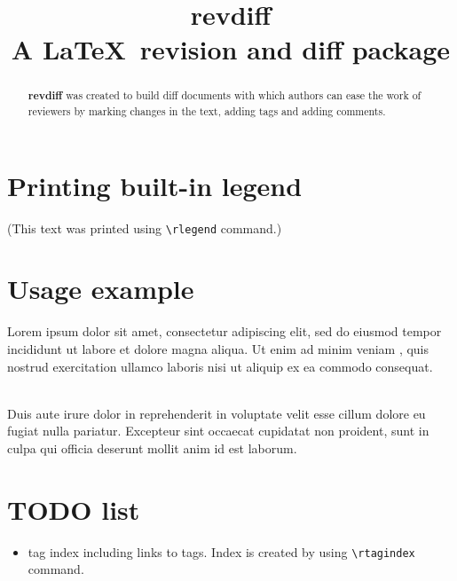 \documentclass[11pt,onecolumn]{article}
\begin{document}
 

\date{\vspace{-5ex}}
\title{{\huge{\bf revdiff}}\\ A \LaTeX ~revision and diff package}
\maketitle


\begin{abstract}
{\bf revdiff} was created to build diff documents with which authors
can ease the work of reviewers by marking changes in the text, adding
tags and adding comments.
\end{abstract}

\section{Printing built-in legend} 

\rlegend

(This text was printed using {\tt \textbackslash rlegend} command.)

\section{Usage example} 

Lorem ipsum dolor sit amet,  consectetur
adipiscing elit, sed do eiusmod tempor incididunt ut labore et dolore
magna aliqua. Ut enim ad minim veniam , quis
nostrud exercitation ullamco laboris nisi ut aliquip ex ea commodo
consequat.

\\ Duis aute irure dolor in reprehenderit
in voluptate velit esse cillum dolore eu fugiat nulla
pariatur.  Excepteur sint occaecat
cupidatat non proident, sunt in culpa qui officia deserunt mollit anim
id est laborum. 

\section{TODO list}

\begin{itemize} 
\item tag index including links to tags. Index is created by using
  {\tt \textbackslash rtagindex} command.
\end{itemize} 
\end{document}

